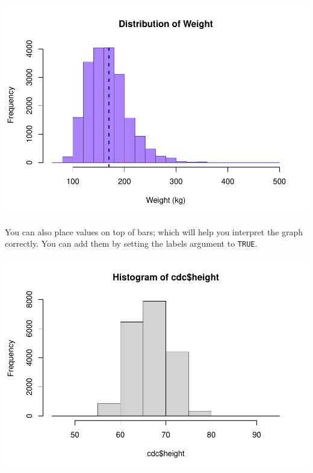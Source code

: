 \documentclass[
]{book}
\newenvironment{Shaded}{\begin{snugshade}}{\end{snugshade}}
\newcommand{\DataTypeTok}[1]{\textcolor[rgb]{0.13,0.29,0.53}{#1}}
\newcommand{\DecValTok}[1]{\textcolor[rgb]{0.00,0.00,0.81}{#1}}
\newcommand{\KeywordTok}[1]{\textcolor[rgb]{0.13,0.29,0.53}{\textbf{#1}}}
\newcommand{\NormalTok}[1]{#1}
\newcommand{\OperatorTok}[1]{\textcolor[rgb]{0.81,0.36,0.00}{\textbf{#1}}}
\newcommand{\OtherTok}[1]{\textcolor[rgb]{0.56,0.35,0.01}{#1}}
\newcommand{\StringTok}[1]{\textcolor[rgb]{0.31,0.60,0.02}{#1}}
\begin{document}
\includegraphics{_main_files/figure-latex/unnamed-chunk-126-1.pdf}

You can also place values on top of bars; which will help you interpret the graph correctly. You can add them by setting the labels argument to \texttt{TRUE}.

\begin{Shaded}
\end{Shaded}

\includegraphics{_main_files/figure-latex/unnamed-chunk-127-1.pdf}
\end{document}
